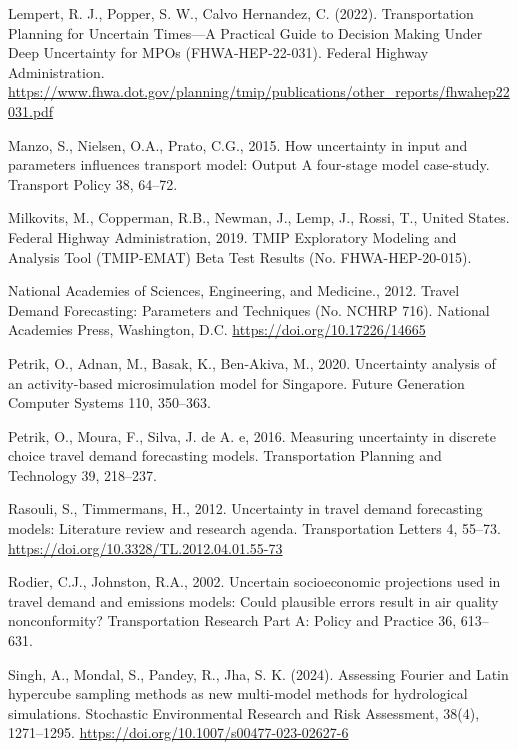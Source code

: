 \documentclass[
  futuretransp,
  submit,
  moreauthors,
]{Definitions/mdpi}
\newlength{\cslhangindent}
\newenvironment{CSLReferences}[2] %
 {\begin{list}{}{%
  \setlength{\itemindent}{0pt}
  \setlength{\leftmargin}{0pt}
  \setlength{\parsep}{0pt}
  \ifodd #1
   \setlength{\leftmargin}{\cslhangindent}
   \setlength{\itemindent}{-1\cslhangindent}
  \fi
  \setlength{\itemsep}{#2\baselineskip}}}
 {\end{list}}
\begin{document}
\begin{CSLReferences}{1}{0}
Lempert, R. J., Popper, S. W., Calvo Hernandez, C. (2022). Transportation
Planning for Uncertain Times—A Practical Guide to Decision Making Under Deep
Uncertainty for MPOs (FHWA-HEP-22-031). Federal Highway Administration.
\url{https://www.fhwa.dot.gov/planning/tmip/publications/other_reports/fhwahep22031.pdf}

Manzo, S., Nielsen, O.A., Prato, C.G., 2015. How uncertainty in input
and parameters influences transport model: Output {A} four-stage model
case-study. Transport Policy 38, 64--72.

Milkovits, M., Copperman, R.B., Newman, J., Lemp, J., Rossi, T., United
States. Federal Highway Administration, 2019. {TMIP Exploratory
Modeling} and {Analysis Tool} ({TMIP-EMAT}) {Beta Test Results} (No.
FHWA-HEP-20-015).

National Academies of Sciences, Engineering, and Medicine., 2012. Travel
{Demand Forecasting}: {Parameters} and {Techniques} (No. NCHRP 716).
National Academies Press, Washington, D.C.
\url{https://doi.org/10.17226/14665}

Petrik, O., Adnan, M., Basak, K., Ben-Akiva, M., 2020. Uncertainty
analysis of an activity-based microsimulation model for {Singapore}.
Future Generation Computer Systems 110, 350--363.

Petrik, O., Moura, F., Silva, J. de A. e, 2016. Measuring uncertainty in
discrete choice travel demand forecasting models. Transportation
Planning and Technology 39, 218--237.

Rasouli, S., Timmermans, H., 2012. Uncertainty in travel demand
forecasting models: Literature review and research agenda.
Transportation Letters 4, 55--73.
\url{https://doi.org/10.3328/TL.2012.04.01.55-73}

Rodier, C.J., Johnston, R.A., 2002. Uncertain socioeconomic projections
used in travel demand and emissions models: Could plausible errors
result in air quality nonconformity? Transportation Research Part A:
Policy and Practice 36, 613--631.

Singh, A., Mondal, S., Pandey, R., Jha, S. K. (2024). Assessing Fourier and
Latin hypercube sampling methods as new multi-model methods for hydrological
simulations. Stochastic Environmental Research and Risk Assessment, 38(4),
1271–1295. \url{https://doi.org/10.1007/s00477-023-02627-6}



\end{CSLReferences}
\end{document}
